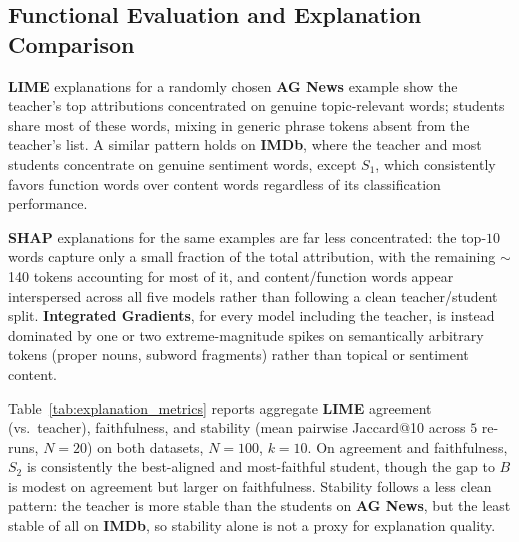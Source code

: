 \documentclass[conference]{IEEEtran}
\begin{document}
\subsection{Functional Evaluation and Explanation Comparison}\label{sec:functional-eval}

\textbf{LIME} explanations for a randomly chosen \textbf{AG News} example show the teacher's top attributions concentrated on genuine topic-relevant words; students share most of these words, mixing in generic phrase tokens absent from the teacher's list. A similar pattern holds on \textbf{IMDb}, where the teacher and most students concentrate on genuine sentiment words, except $S_1$, which consistently favors function words over content words regardless of its classification performance.

\textbf{SHAP} explanations for the same examples are far less concentrated: the top-$10$ words capture only a small fraction of the total attribution, with the remaining $\sim$140 tokens accounting for most of it, and content/function words appear interspersed across all five models rather than following a clean teacher/student split. \textbf{Integrated Gradients}, for every model including the teacher, is instead dominated by one or two extreme-magnitude spikes on semantically arbitrary tokens (proper nouns, subword fragments) rather than topical or sentiment content.

Table~\ref{tab:explanation_metrics} reports aggregate \textbf{LIME} agreement (vs.\ teacher), faithfulness, and stability (mean pairwise Jaccard@10 across $5$ re-runs, $N=20$) on both datasets, $N=100$, $k=10$. On agreement and faithfulness, $S_2$ is consistently the best-aligned and most-faithful student, though the gap to $B$ is modest on agreement but larger on faithfulness. Stability follows a less clean pattern: the teacher is more stable than the students on \textbf{AG News}, but the least stable of all on \textbf{IMDb}, so stability alone is not a proxy for explanation quality.
\end{document}
